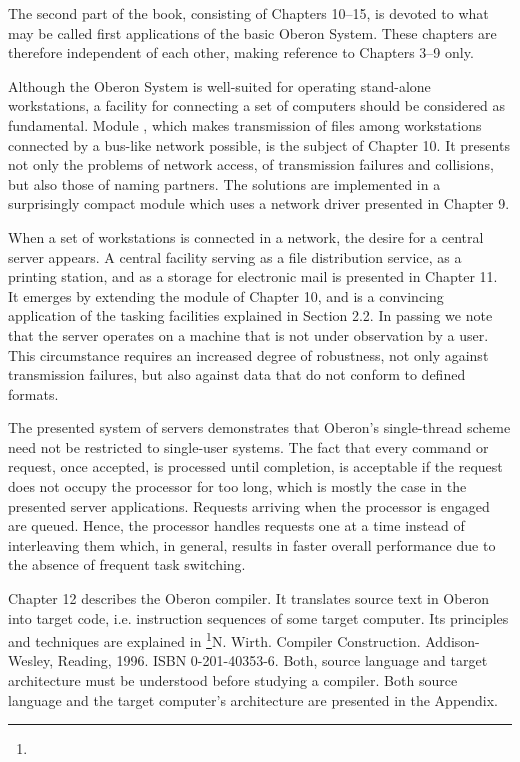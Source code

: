 The second part of the book, consisting of Chapters 10--15, is
devoted to what may be called first applications of the basic Oberon
System. These chapters are therefore independent of each other, making
reference to Chapters 3--9 only.

Although the Oberon System is well-suited for operating stand-alone
workstations, a facility for connecting a set of computers should be
considered as fundamental. Module , which makes transmission of
files among workstations connected by a bus-like network possible, is
the subject of Chapter 10. It presents not only the problems of
network access, of transmission failures and collisions, but also
those of naming partners. The solutions are implemented in a
surprisingly compact module which uses a network driver presented in
Chapter 9.

When a set of workstations is connected in a network, the desire for a
central server appears. A central facility serving as a file
distribution service, as a printing station, and as a storage for
electronic mail is presented in Chapter 11. It emerges by extending
the  module of Chapter 10, and is a convincing application of the
tasking facilities explained in Section 2.2. In passing we note that
the server operates on a machine that is not under observation by a
user. This circumstance requires an increased degree of robustness,
not only against transmission failures, but also against data that do
not conform to defined formats.

The presented system of servers demonstrates that Oberon's
single-thread scheme need not be restricted to single-user
systems. The fact that every command or request, once accepted, is
processed until completion, is acceptable if the request does not
occupy the processor for too long, which is mostly the case in the
presented server applications. Requests arriving when the processor is
engaged are queued. Hence, the processor handles requests one at a
time instead of interleaving them which, in general, results in faster
overall performance due to the absence of frequent task switching.

Chapter 12 describes the Oberon compiler. It translates source text in
Oberon into target code, i.e. instruction sequences of some target
computer. Its principles and techniques are explained in \footnote{{\mc[6]}}{N. Wirth. Compiler Construction. Addison-Wesley, Reading, 1996. ISBN 0-201-40353-6}. Both,
source language and target architecture must be understood before
studying a compiler. Both source language and the target computer's
 architecture are presented in the Appendix.

